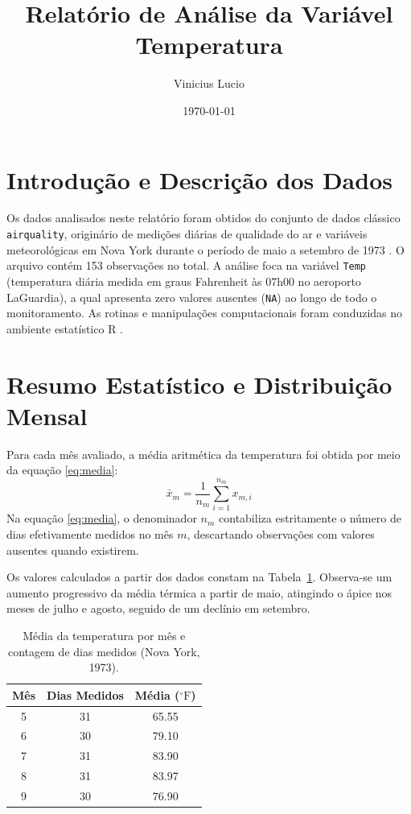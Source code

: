 \documentclass[12pt]{article}
\title{Relatório de Análise da Variável Temperatura}
\author{Vinicius Lucio}
\date{\today}
\begin{document}
\maketitle

\section{Introdução e Descrição dos Dados}

Os dados analisados neste relatório foram obtidos do conjunto de dados clássico \texttt{airquality}, originário de medições diárias de qualidade do ar e variáveis meteorológicas em Nova York durante o período de maio a setembro de 1973 \citep{Chambers1983}. O arquivo contém 153 observações no total. A análise foca na variável \texttt{Temp} (temperatura diária medida em graus Fahrenheit às 07h00 no aeroporto LaGuardia), a qual apresenta zero valores ausentes (\texttt{NA}) ao longo de todo o monitoramento. As rotinas e manipulações computacionais foram conduzidas no ambiente estatístico R \citep{RCoreTeam}.

\section{Resumo Estatístico e Distribuição Mensal}

Para cada mês avaliado, a média aritmética da temperatura foi obtida por meio da equação \eqref{eq:media}:
\begin{equation}
\label{eq:media}
\bar{x}_m = \frac{1}{n_m} \sum_{i=1}^{n_m} x_{m,i}
\end{equation}
Na equação \eqref{eq:media}, o denominador $n_m$ contabiliza estritamente o número de dias efetivamente medidos no mês $m$, descartando observações com valores ausentes quando existirem. 

Os valores calculados a partir dos dados constam na Tabela~\ref{tab:resumo}. Observa-se um aumento progressivo da média térmica a partir de maio, atingindo o ápice nos meses de julho e agosto, seguido de um declínio em setembro.

\begin{table}[htbp]
\centering
\caption{Média da temperatura por mês e contagem de dias medidos (Nova York, 1973).}
\label{tab:resumo}
\begin{tabular}{ccc}
\toprule
Mês & Dias Medidos & Média ($^\circ\text{F}$) \\
\midrule
5 & 31 & 65.55 \\
6 & 30 & 79.10 \\
7 & 31 & 83.90 \\
8 & 31 & 83.97 \\
9 & 30 & 76.90 \\
\bottomrule
\end{tabular}
\end{table}
\end{document}
